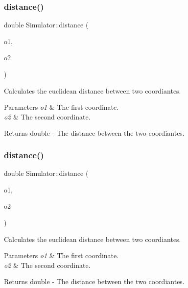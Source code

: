 \subsubsection{\texorpdfstring{distance()}{distance()}\hspace{0.1cm}{\footnotesize\ttfamily [1/2]}}
{\footnotesize\ttfamily double Simulator\+::distance (\begin{DoxyParamCaption}\item[{\hyperlink{structGlobalOrd}{Global\+Ord}}]{o1,  }\item[{\hyperlink{structGlobalOrd}{Global\+Ord}}]{o2 }\end{DoxyParamCaption})}



Calculates the euclidean distance between two coordiantes. 


\begin{DoxyParams}{Parameters}
{\em o1} & The first coordinate. \\
\hline
{\em o2} & The second coordinate. \\
\hline
\end{DoxyParams}
\begin{DoxyReturn}{Returns}
double -\/ The distance between the two coordiantes. 
\end{DoxyReturn}
\mbox{\label{classSimulator_ab21eff1f7776080c591765f099c2fb7e}} 
\subsubsection{\texorpdfstring{distance()}{distance()}\hspace{0.1cm}{\footnotesize\ttfamily [2/2]}}
{\footnotesize\ttfamily double Simulator\+::distance (\begin{DoxyParamCaption}\item[{\hyperlink{structGlobalOrd}{Global\+Ord}}]{o1,  }\item[{\hyperlink{structGlobalOrd}{Global\+Ord}}]{o2 }\end{DoxyParamCaption})}



Calculates the euclidean distance between two coordiantes. 


\begin{DoxyParams}{Parameters}
{\em o1} & The first coordinate. \\
\hline
{\em o2} & The second coordinate. \\
\hline
\end{DoxyParams}
\begin{DoxyReturn}{Returns}
double -\/ The distance between the two coordiantes. 
\end{DoxyReturn}
\mbox{\label{classSimulator_acd0a0ca3e9d25ea92ffc05e14b77c5e6}} 

